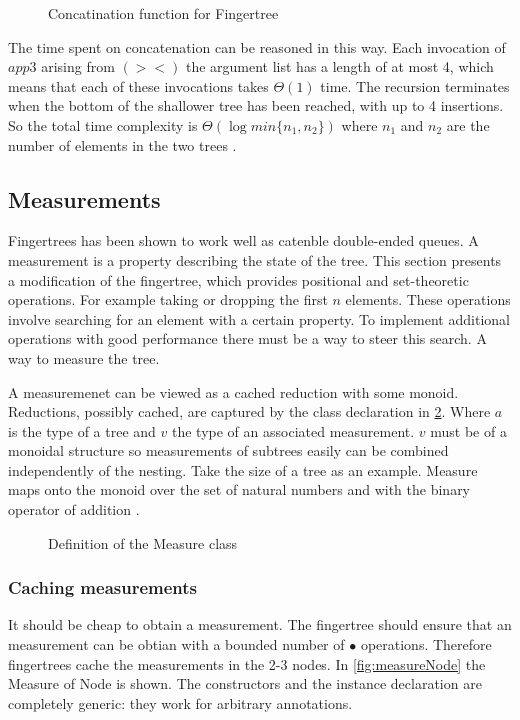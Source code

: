 \begin{figure}[h!]

\caption{Concatination function for Fingertree \label{fig:concat}}
\end{figure}

The time spent on concatenation can be reasoned in this way. Each invocation of
$app3$ arising from $(><)$ the argument list has a length of at most 4, which
means that each of these invocations takes $\Theta(1)$ time. The recursion
terminates when the bottom of the shallower tree has been reached, with up to
4 insertions. So the total time complexity is $\Theta(\log min\{n_1, n_2\})$
where $n_1$ and $n_2$ are the number of elements in the two trees
\cite{fingertree}.

\subsection{Measurements}
Fingertrees has been shown to work well as catenble double-ended queues. A 
measurement is a property describing the state of the tree. This section
presents a modification of the fingertree, which provides positional and
set-theoretic operations. For example taking or dropping the first $n$ elements.
These operations involve searching for an element with a certain property.
To implement additional operations with good performance there must be a way
to steer this search. A way to measure the tree.

A measuremenet can be viewed as a cached reduction with some monoid. 
Reductions, possibly cached, are captured by the class declaration in 
\cref{fig:measure}. Where $a$ is the type of a tree and $v$ the type of an
associated measurement. $v$ must be of a monoidal structure so measurements of
subtrees easily can be combined independently of the nesting. Take the size of a
tree as an example. Measure maps onto the monoid over the set of natural numbers
and with the binary operator of addition \cite{fingertree}.

\begin{figure}[h!]

\caption{Definition of the Measure class \label{fig:measure}}
\end{figure}

\subsubsection{Caching measurements}
It should be cheap to obtain a measurement. The fingertree should ensure that an
measurement can be obtian with a bounded number of $\bullet$ operations.
Therefore fingertrees cache the measurements in the 2-3 nodes. In
\cref{fig:measureNode} the Measure of Node is shown.
The constructors and the instance declaration are completely generic: they
work for arbitrary annotations.

